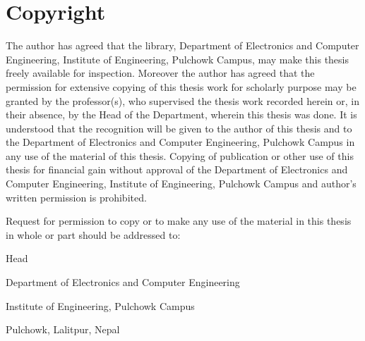 \chapter*{Copyright}
\doublespacing
\vspace{3cm}

The author has agreed that the library, Department of Electronics and Computer Engineering,
Institute of Engineering, Pulchowk Campus, may make this thesis freely available for inspection. Moreover the author has agreed that the permission for extensive copying of this thesis work for scholarly purpose may be granted by the professor(s), who supervised the thesis work recorded herein or, in their absence, by the Head of the Department, wherein this thesis was done. It is understood that the recognition will be given to the author of this thesis and to the Department of Electronics and Computer Engineering, Pulchowk Campus in any use of the material of this thesis. Copying of publication or other use of this thesis for financial gain without approval of the Department of Electronics and Computer Engineering, Institute of Engineering, Pulchowk Campus and author’s written permission is prohibited.

Request for permission to copy or to make any use of the material in this thesis in whole or part should be addressed to:



Head

Department of Electronics and Computer Engineering

Institute of Engineering, Pulchowk Campus

Pulchowk, Lalitpur, Nepal


